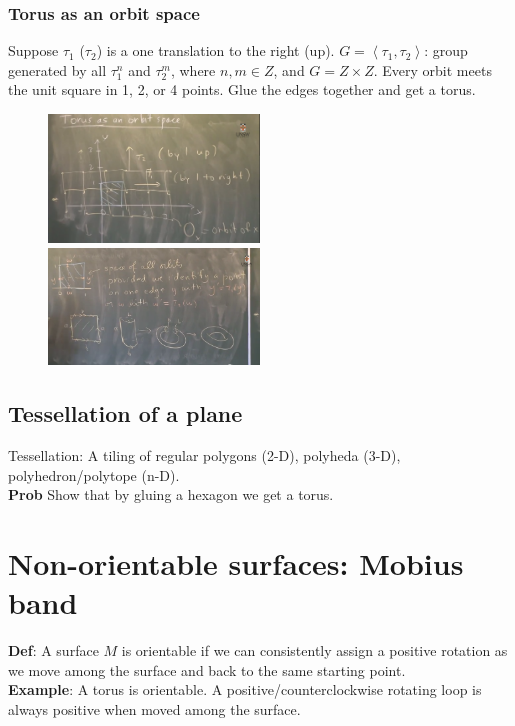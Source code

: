 \documentclass[12pt]{article}
\begin{document}
\subsubsection{Torus as an orbit space}
  Suppose $\tau_1$ ($\tau_2$) is a one translation to the right (up).
  $G= \left< \tau_1, \tau_2 \right>$: group generated by all $\tau_1^n$ and $\tau_2^m$, where $n, m \in Z$, and $G= Z \times Z$.
  Every orbit meets the unit square in 1, 2, or 4 points. 
  Glue the edges together and get a torus.
  \begin{figure}[H]
     \includegraphics[width=0.5\textwidth]{torus_orbit_space1}
     \includegraphics[width=0.5\textwidth]{torus_orbit_space2}
  \end{figure}

\subsection{Tessellation of a plane}
Tessellation: A tiling of regular polygons (2-D), polyheda (3-D), polyhedron/polytope (n-D). \\

{\bf Prob} Show that by gluing a hexagon we get a torus.


\section{Non-orientable surfaces: Mobius band}
{\bf Def}: A surface $M$ is orientable if we can consistently assign a positive rotation as we move among the surface and back to the same starting point. \\

{\bf Example}: A torus is orientable. A positive/counterclockwise rotating loop is always positive when moved among the surface. \\
\end{document}
